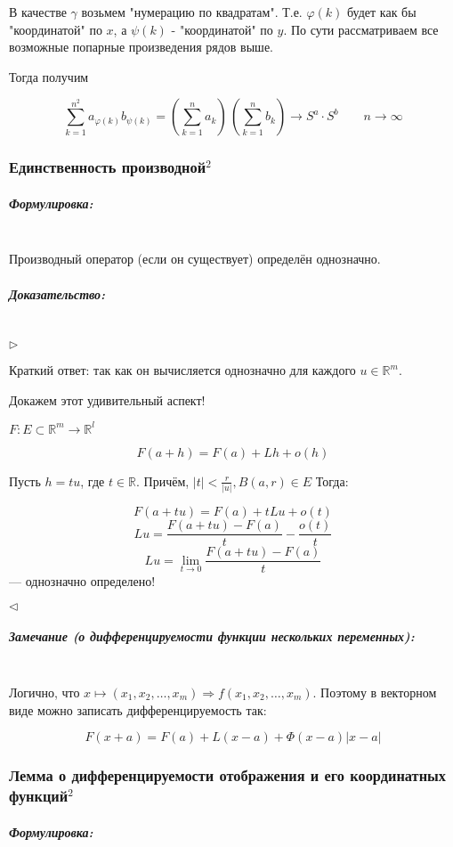 \documentclass{article}
\let\vanillasubparagraph\subparagraph
\renewcommand{\subparagraph}[1]{\vanillasubparagraph{#1}\mbox{}\\}
\begin{document}
В качестве $\gamma$ возьмем "нумерацию по квадратам". Т.е. $\varphi(k)$ будет как бы "координатой" по $x$, а $\psi(k)$ - "координатой" по $y$. По сути рассматриваем все возможные попарные произведения рядов выше.

Тогда получим

$$
\sum_{k=1}^{n^2} a_{\varphi(k)}b_{\psi(k)} = \left(\sum_{k=1}^n a_k\right) \, \left(\sum_{k=1}^n b_k\right) \to S^a \cdot S^b \qquad n\to \infty
$$

\subsubsection{Единственность производной\texorpdfstring{$^2$}{}}

\subparagraph{Формулировка: }

Производный оператор (если он существует) определён однозначно.

\subparagraph{Доказательство: }

$\rhd$

Краткий ответ: так как он вычисляется однозначно для каждого $u \in \mathbb{R}^m$.

Докажем этот удивительный аспект!

$F: E \subset \mathbb{R}^m \rightarrow \mathbb{R}^l$

\[F(a + h) = F(a) + Lh + o(h)\]

Пусть $h = tu$, где $t \in \mathbb{R}$. Причём, $|t| < \frac{r}{|u|}, B(a, r) \in E$ Тогда:

\[F(a + tu) = F(a) + tLu + o(t)\]
\[Lu = \frac{F(a + tu) - F(a)}{t} - \frac{o(t)}{t}\]
\[Lu = \lim_{t \rightarrow 0}{\frac{F(a + tu) - F(a)}{t}}\] --- однозначно определено!

$\lhd$

\subparagraph{Замечание (о дифференцируемости функции нескольких переменных): }

Логично, что $x \mapsto (x_1, x_2, \ldots, x_m) \Rightarrow f(x_1, x_2, \ldots, x_m)$. Поэтому в векторном виде можно записать дифференцируемость так:

\[F(x + a) = F(a) + L(x - a) + \Phi(x - a)|x - a|\]

\subsubsection{Лемма о дифференцируемости отображения и его координатных функций\texorpdfstring{$^2$}{}}

\subparagraph{Формулировка: }
\end{document}
